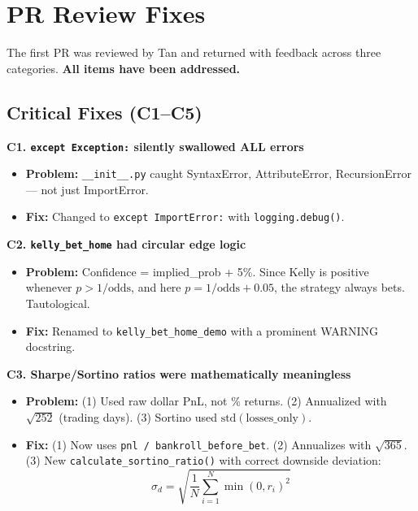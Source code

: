 \documentclass[11pt,a4paper]{article}
\begin{document}
\section{PR Review Fixes}

The first PR was reviewed by Tan and returned with feedback across three categories. \textbf{All items have been addressed.}

\subsection{Critical Fixes (C1--C5)}

\textbf{C1. \texttt{except Exception:} silently swallowed ALL errors}
\begin{itemize}[nosep]
    \item \textbf{Problem:} \texttt{\_\_init\_\_.py} caught SyntaxError, AttributeError, RecursionError --- not just ImportError.
    \item \textbf{Fix:} Changed to \texttt{except ImportError:} with \texttt{logging.debug()}.
\end{itemize}

\textbf{C2. \texttt{kelly\_bet\_home} had circular edge logic}
\begin{itemize}[nosep]
    \item \textbf{Problem:} Confidence = implied\_prob + 5\%. Since Kelly is positive whenever $p > 1/\text{odds}$, and here $p = 1/\text{odds} + 0.05$, the strategy always bets. Tautological.
    \item \textbf{Fix:} Renamed to \texttt{kelly\_bet\_home\_demo} with a prominent WARNING docstring.
\end{itemize}

\textbf{C3. Sharpe/Sortino ratios were mathematically meaningless}
\begin{itemize}[nosep]
    \item \textbf{Problem:} (1) Used raw dollar PnL, not \% returns. (2) Annualized with $\sqrt{252}$ (trading days). (3) Sortino used $\text{std}(\text{losses\_only})$.
    \item \textbf{Fix:} (1) Now uses \texttt{pnl / bankroll\_before\_bet}. (2) Annualizes with $\sqrt{365}$. (3) New \texttt{calculate\_sortino\_ratio()} with correct downside deviation:
    \[
    \sigma_d = \sqrt{\frac{1}{N}\sum_{i=1}^{N} \min(0, r_i)^2}
    \]
\end{itemize}
\end{document}
